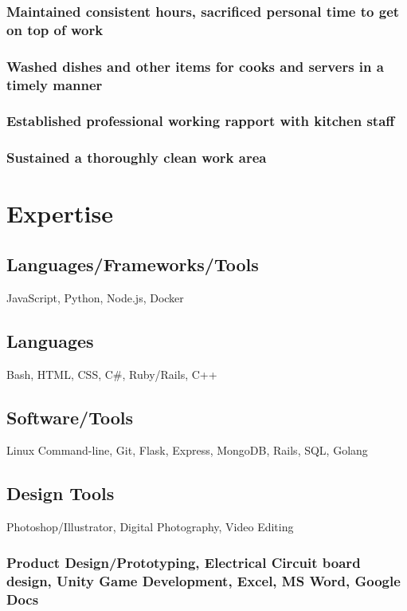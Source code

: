 \documentclass{article}
\begin{document}
		\subsubsection{Maintained consistent hours, sacrificed personal time to get on top of work}
		\subsubsection{Washed dishes and other items for cooks and servers in a timely manner}
		\subsubsection{Established professional working rapport with kitchen staff}
		\subsubsection{Sustained a thoroughly clean work area}


\section{Expertise}
		\subsection{Languages/Frameworks/Tools}
		JavaScript, Python, Node.js, Docker
		\subsection{Languages}
		Bash, HTML, CSS,  C\#, Ruby/Rails, C++
		\vspace{-2mm}
		
		\subsection{Software/Tools}
		Linux Command-line, Git, Flask, Express, MongoDB, Rails, SQL, Golang
		\vspace{-3mm}
		\subsection{Design Tools}Photoshop/Illustrator, Digital Photography, Video Editing
		\vspace{-3mm}
		\subsubsection{Product Design/Prototyping, Electrical Circuit board design, Unity Game Development, Excel, MS Word, Google Docs}
		\vspace{-3mm}
\end{document}
